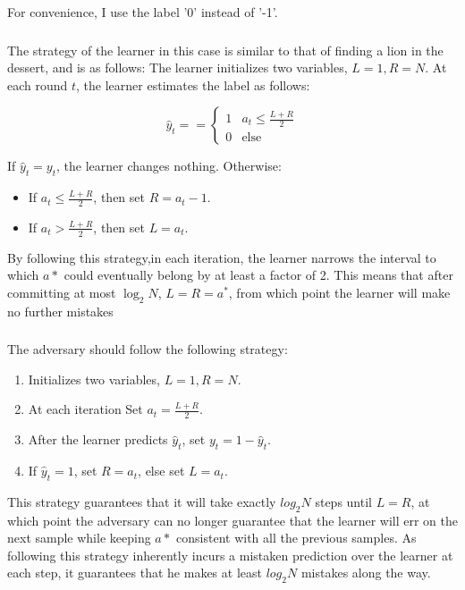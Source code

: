 For convenience, I use the label '0' instead of '-1'.
\subsubsection{}
The strategy of the learner in this case is similar to that of finding a lion in the dessert, and is as follows:
The learner initializes two variables, $L=1, R=N$. At each round $t$, the learner estimates the label as follows:

\begin{equation*}    
    \hat{y}_t==\begin{cases}
        1 & a_t \leq \frac{L+R}{2} \\ 
        0 & \text{else}
             \end{cases}
\end{equation*}

If $\hat{y}_t = y_t$, the learner changes nothing. Otherwise:
\begin{itemize}
    \item If $a_t \leq \frac{L+R}{2}$, then set $R = a_t-1$.
    \item If $a_t > \frac{L+R}{2}$, then set $L = a_t$.
\end{itemize}
By following this strategy,in each iteration, the learner narrows the interval to which $a*$ could eventually belong by at least a factor of 2. This means that after committing at most $\log_2N$, $L=R=a^*$, from which point the learner will make no further mistakes

\subsubsection{}
The adversary should follow the following strategy:
\begin{enumerate}
    \item Initializes two variables, $L=1, R=N$.
    \item At each iteration Set $a_t = \frac{L+R}{2}$.
    \item After the learner predicts $\hat{y}_t$, set $y_t = 1 - \hat{y}_t$.
    \item If $\hat{y}_t = 1$, set $R = a_t$, else set $L = a_t$.
\end{enumerate}
This strategy guarantees that it will take exactly $log_2N$ steps until $L=R$, at which point the adversary can no longer guarantee that the learner will err on the next sample while keeping $a*$ consistent with all the previous samples. As following this strategy inherently incurs a mistaken prediction over the learner at each step, it guarantees that he makes at least $log_2N$ mistakes along the way.